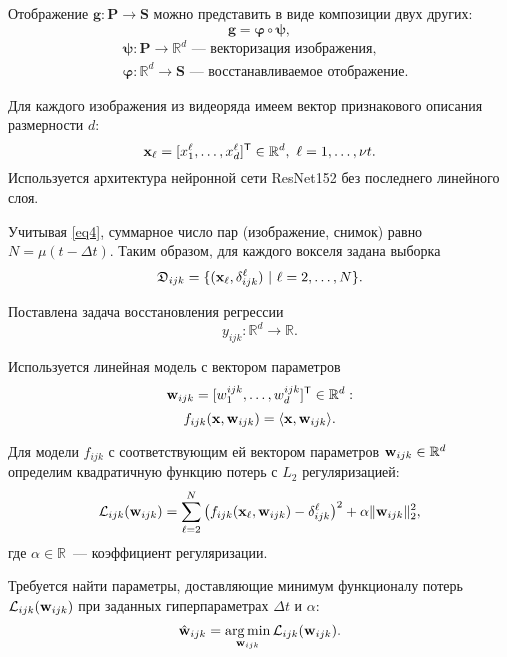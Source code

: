 \documentclass[a4paper, 12pt]{extarticle}
\begin{document}
Отображение $\mathbf{g}: \mathbf{P} \to \mathbf{S}$ можно представить в виде композиции
двух других:
\[ \mathbf{g} = \bm{\varphi} \circ \bm{\psi}, \]
\vspace{-0.8cm}
\begin{align*}
	 & \bm{\psi}: \mathbf{P} \to \mathbb{R}^d
	\text{~--- векторизация изображения,}        \\
	 & \bm{\varphi}: \mathbb{R}^d \to \mathbf{S}
	\text{~--- восстанавливаемое отображение.}
\end{align*}

Для каждого изображения из видеоряда имеем вектор признакового описания размерности $d$:
\[ \mathbf{x}_{\ell} = [x^{\ell}_1, \ldots, x^{\ell}_{d}]^{\mathsf{T}} \in \mathbb{R}^{d}, \ {\ell} = 1, \ldots, \nu t. \]
Используется архитектура нейронной сети ResNet152 без последнего линейного слоя.

Учитывая \eqref{eq4}, суммарное число пар (изображение, снимок)
равно $N = \mu (t - \Delta t)$. Таким образом, для каждого вокселя задана выборка
\[ \mathfrak{D}_{ijk} = \{(\mathbf{x}_{\ell}, \delta^{\ell}_{ijk}) \ | \ {\ell} = 2, \ldots, N \}. \]

Поставлена задача восстановления регрессии
\begin{equation}
	\label{eq6}
	y_{ijk}: \mathbb{R}^{d} \to \mathbb{R}.
\end{equation}

Используется линейная модель с вектором параметров
\[ \mathbf{w}_{ijk} = [w^{ijk}_1, \ldots, w^{ijk}_{d}]^{\mathsf{T}} \in \mathbb{R}^{d}: \]
\begin{equation}
	\label{eq7}
	f_{ijk}(\mathbf{x}, \mathbf{w}_{ijk}) = \langle \mathbf{x}, \mathbf{w}_{ijk} \rangle.
\end{equation}

Для модели $f_{ijk}$ с соответствующим ей вектором параметров $\mathbf{w}_{ijk} \in \mathbb{R}^{d}$
определим квадратичную функцию потерь с $L_2$ регуляризацией:
\begin{equation}
	\label{eq8}
	\mathcal{L}_{ijk}(\mathbf{w}_{ijk}) = \sum\limits_{\ell = 2}^{N} \big(f_{ijk}(\mathbf{x}_{\ell}, \mathbf{w}_{ijk}) - \delta^{\ell}_{ijk}\big)^2 + \alpha \| \mathbf{w}_{ijk} \|_2^2,
\end{equation}
где $\alpha \in \mathbb{R}$~--- коэффициент регуляризации.

Требуется найти параметры, доставляющие минимум функционалу потерь $\mathcal{L}_{ijk}(\mathbf{w}_{ijk})$
при заданных гиперпараметрах $\Delta t$ и $\alpha$:
\begin{equation}
	\label{eq9}
	\hat{\mathbf{w}}_{ijk} = \operatorname*{arg\,min}_{\mathbf{w}_{ijk}} \mathcal{L}_{ijk}(\mathbf{w}_{ijk}).
\end{equation}
\end{document}
